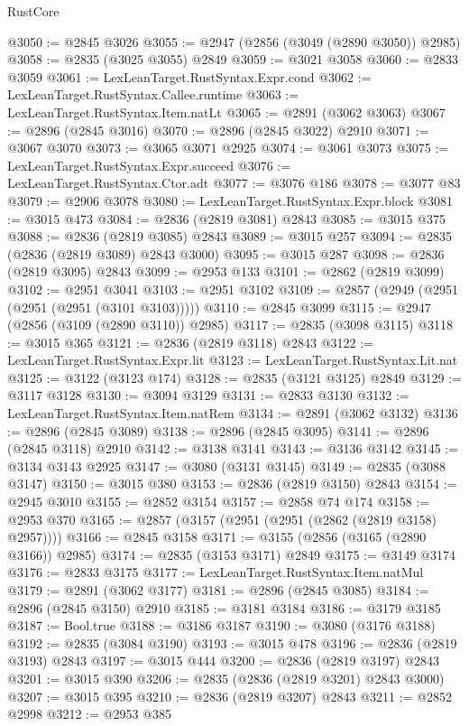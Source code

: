 \begin{lexlean}{RustCore}
\begin{coremodule}
@3050 := @2845 @3026
@3055 := @2947 (@2856 (@3049 (@2890 @3050)) @2985)
@3058 := @2835 (@3025 @3055) @2849
@3059 := @3021 @3058
@3060 := @2833 @3059
@3061 := LexLeanTarget.RustSyntax.Expr.cond
@3062 := LexLeanTarget.RustSyntax.Callee.runtime
@3063 := LexLeanTarget.RustSyntax.Item.natLt
@3065 := @2891 (@3062 @3063)
@3067 := @2896 (@2845 @3016)
@3070 := @2896 (@2845 @3022) @2910
@3071 := @3067 @3070
@3073 := @3065 @3071 @2925
@3074 := @3061 @3073
@3075 := LexLeanTarget.RustSyntax.Expr.succeed
@3076 := LexLeanTarget.RustSyntax.Ctor.adt
@3077 := @3076 @186
@3078 := @3077 @83
@3079 := @2906 @3078
@3080 := LexLeanTarget.RustSyntax.Expr.block
@3081 := @3015 @473
@3084 := @2836 (@2819 @3081) @2843
@3085 := @3015 @375
@3088 := @2836 (@2819 @3085) @2843
@3089 := @3015 @257
@3094 := @2835 (@2836 (@2819 @3089) @2843 @3000)
@3095 := @3015 @287
@3098 := @2836 (@2819 @3095) @2843
@3099 := @2953 @133
@3101 := @2862 (@2819 @3099)
@3102 := @2951 @3041
@3103 := @2951 @3102
@3109 := @2857 (@2949 (@2951 (@2951 (@2951 (@3101 @3103)))))
@3110 := @2845 @3099
@3115 := @2947 (@2856 (@3109 (@2890 @3110)) @2985)
@3117 := @2835 (@3098 @3115)
@3118 := @3015 @365
@3121 := @2836 (@2819 @3118) @2843
@3122 := LexLeanTarget.RustSyntax.Expr.lit
@3123 := LexLeanTarget.RustSyntax.Lit.nat
@3125 := @3122 (@3123 @174)
@3128 := @2835 (@3121 @3125) @2849
@3129 := @3117 @3128
@3130 := @3094 @3129
@3131 := @2833 @3130
@3132 := LexLeanTarget.RustSyntax.Item.natRem
@3134 := @2891 (@3062 @3132)
@3136 := @2896 (@2845 @3089)
@3138 := @2896 (@2845 @3095)
@3141 := @2896 (@2845 @3118) @2910
@3142 := @3138 @3141
@3143 := @3136 @3142
@3145 := @3134 @3143 @2925
@3147 := @3080 (@3131 @3145)
@3149 := @2835 (@3088 @3147)
@3150 := @3015 @380
@3153 := @2836 (@2819 @3150) @2843
@3154 := @2945 @3010
@3155 := @2852 @3154
@3157 := @2858 @74 @174
@3158 := @2953 @370
@3165 := @2857 (@3157 (@2951 (@2951 (@2862 (@2819 @3158) @2957))))
@3166 := @2845 @3158
@3171 := @3155 (@2856 (@3165 (@2890 @3166)) @2985)
@3174 := @2835 (@3153 @3171) @2849
@3175 := @3149 @3174
@3176 := @2833 @3175
@3177 := LexLeanTarget.RustSyntax.Item.natMul
@3179 := @2891 (@3062 @3177)
@3181 := @2896 (@2845 @3085)
@3184 := @2896 (@2845 @3150) @2910
@3185 := @3181 @3184
@3186 := @3179 @3185
@3187 := Bool.true
@3188 := @3186 @3187
@3190 := @3080 (@3176 @3188)
@3192 := @2835 (@3084 @3190)
@3193 := @3015 @478
@3196 := @2836 (@2819 @3193) @2843
@3197 := @3015 @444
@3200 := @2836 (@2819 @3197) @2843
@3201 := @3015 @390
@3206 := @2835 (@2836 (@2819 @3201) @2843 @3000)
@3207 := @3015 @395
@3210 := @2836 (@2819 @3207) @2843
@3211 := @2852 @2998
@3212 := @2953 @385

\end{coremodule}
\end{lexlean}
